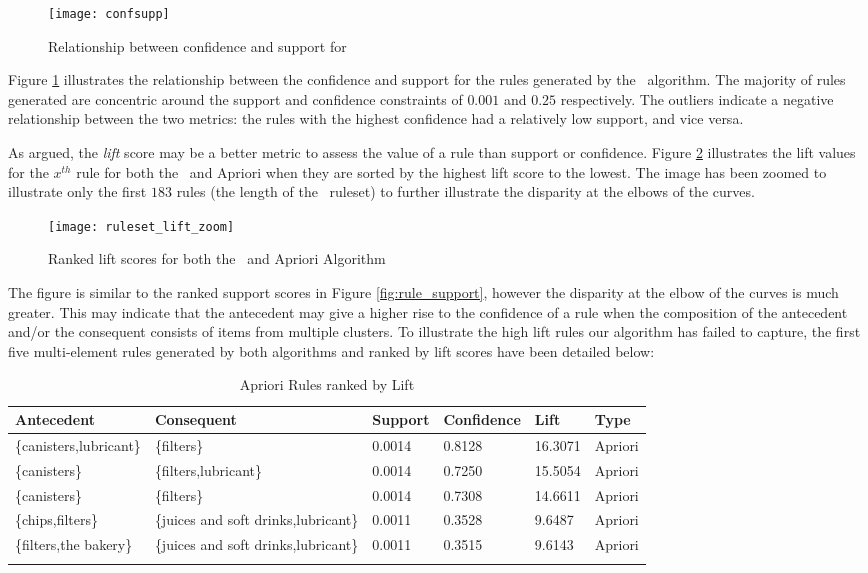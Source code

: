 \begin{figure}[H]
\centering
\texttt{[image: confsupp]}
\caption{Relationship between confidence and support for \algo}
\label{fig:confsupp}
\end{figure}
Figure \ref{fig:confsupp} illustrates the relationship between the confidence and support for the rules generated by the \algo\ algorithm.
The majority of rules generated are concentric around the support and confidence constraints of $0.001$ and $0.25$ respectively. The outliers indicate a negative relationship between the two metrics: the rules with the highest confidence had a relatively low support, and vice versa.

As  argued, the \textit{lift} score may be a better metric to assess the value of a rule than support or confidence. Figure \ref{fig:rule_lift} illustrates the lift values for the $x^{th}$ rule for both the \algo\ and Apriori when they are sorted by the highest lift score to the lowest. The image has been zoomed to illustrate only the first $183$ rules (the length of the \algo\ ruleset) to further illustrate the disparity at the elbows of the curves.
\begin{figure}[H]
\centering
\texttt{[image: ruleset\_lift\_zoom]}
\caption{Ranked lift scores for both the \algo\ and Apriori Algorithm}
\label{fig:rule_lift}
\end{figure}
The figure is similar to the ranked support scores in Figure \ref{fig:rule_support}, however the disparity at the elbow of the curves is much greater. This may indicate that the antecedent may give a higher rise to the confidence of a rule when the composition of the antecedent and/or the consequent consists of items from multiple clusters. To illustrate the high lift rules our algorithm has failed to capture, the first five multi-element rules generated by both algorithms and ranked by lift scores have been detailed below:

\begin{longtable}
{@{}llllll@{}}\toprule Antecedent& Consequent& Support& Confidence& Lift& Type\\*\midrule\endfirsthead\endhead
\{canisters,lubricant\} & \{filters\} & 0.0014 & 0.8128 & 16.3071 & Apriori\\
\{canisters\} & \{filters,lubricant\} & 0.0014 & 0.7250 & 15.5054 & Apriori\\
\{canisters\} & \{filters\} & 0.0014 & 0.7308 & 14.6611 & Apriori\\
\{chips,filters\} & \{juices and soft drinks,lubricant\} & 0.0011 & 0.3528 & 9.6487 & Apriori\\
\{filters,the bakery\} & \{juices and soft drinks,lubricant\} & 0.0011 & 0.3515 & 9.6143 & Apriori\\
\midrule\caption{Apriori Rules ranked by Lift}\label{tab:apri_lift}\end{longtable}

